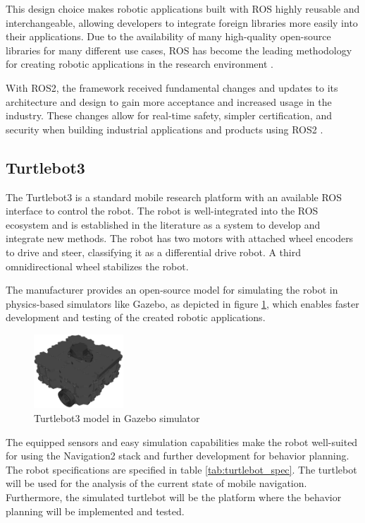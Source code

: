 This design choice makes robotic applications built with ROS highly reusable and interchangeable, allowing developers to integrate foreign libraries more easily into their applications. Due to the availability of many high-quality open-source libraries for many different use cases, ROS has become the leading methodology for creating robotic applications in the research environment \cite{quigley2009}. 

With ROS2, the framework received fundamental changes and updates to its architecture and design to gain more acceptance and increased usage in the industry. These changes allow for real-time safety, simpler certification, and security when building industrial applications and products using ROS2 \cite{ros2022}. 

\subsection{Turtlebot3}
\label{subsec:Turtlebot3}

The Turtlebot3 is a standard mobile research platform with an available ROS interface to control the robot. The robot is well-integrated into the ROS ecosystem and is established in the literature as a system to develop and integrate new methods. The robot has two motors with attached wheel encoders to drive and steer, classifying it as a differential drive robot. A third omnidirectional wheel stabilizes the robot. 

The manufacturer provides an open-source model for simulating the robot in physics-based simulators like Gazebo, as depicted in figure \ref{fig:turtlebot}, which enables faster development and testing of the created robotic applications.

\begin{figure}[ht]
	\centering
	\includegraphics[width=0.3\textwidth]{images/turtlebot_sim.png}
	\caption{Turtlebot3 model in Gazebo simulator}
	\label{fig:turtlebot}
\end{figure}

The equipped sensors and easy simulation capabilities make the robot well-suited for using the Navigation2 stack and further development for behavior planning. The robot specifications are specified in table \ref{tab:turtlebot_spec}. The turtlebot will be used for the analysis of the current state of mobile navigation. Furthermore, the simulated turtlebot will be the platform where the behavior planning will be implemented and tested.

